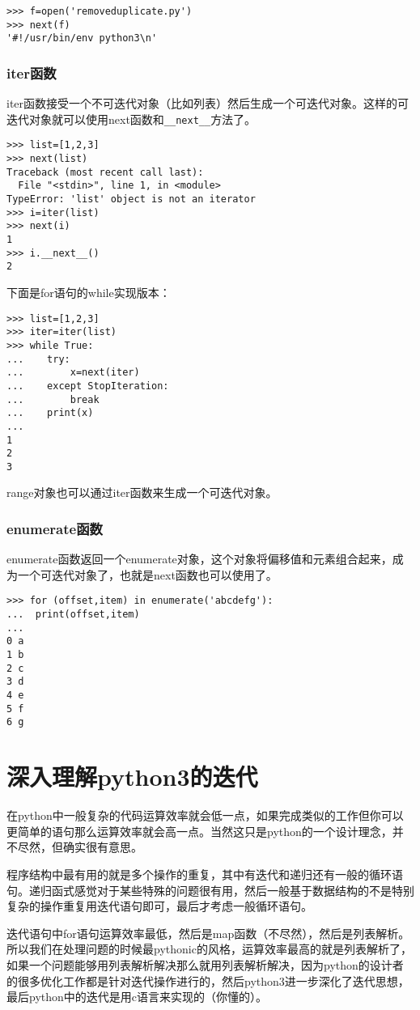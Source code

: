 \documentclass[12pt,oneside]{book}
\begin{document}
\begin{common-format}
\begin{Verbatim}
>>> f=open('removeduplicate.py')
>>> next(f)
'#!/usr/bin/env python3\n'
\end{Verbatim}

\subsection{iter函数}
iter函数接受一个不可迭代对象（比如列表）然后生成一个可迭代对象。这样的可迭代对象就可以使用next函数和\verb+__next__+方法了。

\begin{Verbatim}
>>> list=[1,2,3]
>>> next(list)
Traceback (most recent call last):
  File "<stdin>", line 1, in <module>
TypeError: 'list' object is not an iterator
>>> i=iter(list)
>>> next(i)
1
>>> i.__next__()
2
\end{Verbatim}

下面是for语句的while实现版本：
\begin{Verbatim}
>>> list=[1,2,3]
>>> iter=iter(list)
>>> while True:
...    try:
...        x=next(iter)
...    except StopIteration:
...        break
...    print(x)
... 
1
2
3
\end{Verbatim}

range对象也可以通过iter函数来生成一个可迭代对象。

\subsection{enumerate函数}
enumerate函数返回一个enumerate对象，这个对象将偏移值和元素组合起来，成为一个可迭代对象了，也就是next函数也可以使用了。

\begin{Verbatim}
>>> for (offset,item) in enumerate('abcdefg'):
...  print(offset,item)
... 
0 a
1 b
2 c
3 d
4 e
5 f
6 g
\end{Verbatim}

\chapter{深入理解python3的迭代}
\label{sec:深入理解python3的迭代}
在python中一般复杂的代码运算效率就会低一点，如果完成类似的工作但你可以更简单的语句那么运算效率就会高一点。当然这只是python的一个设计理念，并不尽然，但确实很有意思。

程序结构中最有用的就是多个操作的重复，其中有迭代和递归还有一般的循环语句。递归函式感觉对于某些特殊的问题很有用，然后一般基于数据结构的不是特别复杂的操作重复用迭代语句即可，最后才考虑一般循环语句。

迭代语句中for语句运算效率最低，然后是map函数（不尽然），然后是列表解析。所以我们在处理问题的时候最pythonic的风格，运算效率最高的就是列表解析了，如果一个问题能够用列表解析解决那么就用列表解析解决，因为python的设计者的很多优化工作都是针对迭代操作进行的，然后python3进一步深化了迭代思想，最后python中的迭代是用c语言来实现的（你懂的）。


\end{common-format}
\end{document}
